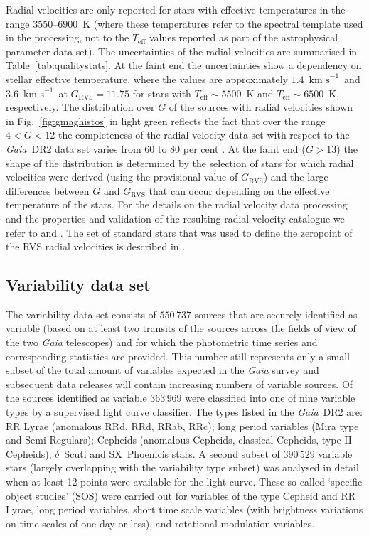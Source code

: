 \documentclass[longauth]{aa_gaia} %
\newcommand\gaia{\textit{Gaia}}
\newcommand\gdr[1]{\gaia~DR#1}
\newcommand\figref[1]{Fig.~\ref{#1}}
\newcommand\tabref[1]{Table~\ref{#1}}
\newcommand\gdrtwovarnum{\ensuremath{550\,737}}
\newcommand\gdrtwovartypednum{\ensuremath{363\,969}}
\newcommand\gdrtwovarsostotnum{\ensuremath{390\,529}}
\newcommand\kms{\ensuremath{\text{km~s}^{-1}}}
\newcommand\grvs{\ensuremath{G_\mathrm{RVS}}}
\newcommand\teff{\ensuremath{T_\mathrm{eff}}}
\begin{document}
Radial velocities are only reported for stars with effective temperatures in the range
$3550$--$6900$~K (where these temperatures refer to the spectral template used in the processing,
not to the {\teff} values reported as part of the astrophysical parameter data set). The
uncertainties of the radial velocities are summarised in \tabref{tab:qualitystats}. At the faint end
the uncertainties show a dependency on stellar effective temperature, where the values are
approximately $1.4$~\kms\ and $3.6$~\kms\ at $\grvs=11.75$ for stars with $\teff\sim5500$~K and
$\teff\sim6500$~K, respectively. The distribution over $G$ of the sources with radial velocities
shown in \figref{fig:gmaghistos} in light green reflects the fact that over the range $4<G<12$ the
completeness of the radial velocity data set with respect to the \gdr{2} data set varies from 60 to
80 per cent \citep{DR2-DPACP-54}. At the faint end ($G>13$) the shape of the distribution is
determined by the selection of stars for which radial velocities were derived (using the provisional
value of \grvs) and the large differences between $G$ and $\grvs$ that can occur depending on the
effective temperature of the stars. For the details on the radial velocity data processing and the
properties and validation of the resulting radial velocity catalogue we refer to \cite{DR2-DPACP-47}
and \cite{DR2-DPACP-54}. The set of standard stars that was used to define the zeropoint of the RVS
radial velocities is described in \cite{DR2-DPACP-48}.

\subsection{Variability data set} 
\label{sec:varidata}

The variability data set consists of {\gdrtwovarnum} sources that are securely identified as
variable (based on at least two transits of the sources across the fields of view of the two {\gaia}
telescopes) and for which the photometric time series and corresponding statistics are provided.
This number still represents only a small subset of the total amount of variables expected in the
{\gaia} survey and subsequent data releases will contain increasing numbers of variable sources. Of
the sources identified as variable {\gdrtwovartypednum} were classified into one of nine variable
types by a supervised light curve classifier. The types listed in the \gdr{2} are: RR Lyrae
(anomalous RRd, RRd, RRab, RRc); long period variables (Mira type and Semi-Regulars); Cepheids
(anomalous Cepheids, classical Cepheids, type-II Cepheids); $\delta$~Scuti and SX~Phoenicis stars. A
second subset of {\gdrtwovarsostotnum} variable stars (largely overlapping with the variability type
subset) was analysed in detail when at least 12 points were available for the light curve. These
so-called `specific object studies' (SOS) were carried out for variables of the type Cepheid and RR
Lyrae, long period variables, short time scale variables (with brightness variations on time scales
of one day or less), and rotational modulation variables.
\end{document}
